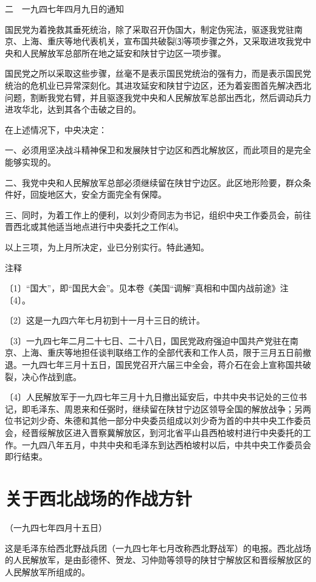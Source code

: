 \documentclass[UTF-8, a5paper, 12pt]{ctexart}
\begin{document}
二　一九四七年四月九日的通知

国民党为着挽救其垂死统治，除了采取召开伪国大，制定伪宪法，驱逐我党驻南京、上海、重庆等地代表机关，宣布国共破裂⑶等项步骤之外，又采取进攻我党中央和人民解放军总部所在地之延安和陕甘宁边区一项步骤。

国民党之所以采取这些步骤，丝毫不是表示国民党统治的强有力，而是表示国民党统治的危机业已异常深刻化。其进攻延安和陕甘宁边区，还为着妄图首先解决西北问题，割断我党右臂，并且驱逐我党中央和人民解放军总部出西北，然后调动兵力进攻华北，达到其各个击破之目的。

在上述情况下，中央决定：

一、必须用坚决战斗精神保卫和发展陕甘宁边区和西北解放区，而此项目的是完全能够实现的。

二、我党中央和人民解放军总部必须继续留在陕甘宁边区。此区地形险要，群众条件好，回旋地区大，安全方面完全有保障。

三、同时，为着工作上的便利，以刘少奇同志为书记，组织中央工作委员会，前往晋西北或其他适当地点进行中央委托之工作⑷。

以上三项，为上月所决定，业已分别实行。特此通知。

注释

〔1〕“国大”，即“国民大会”。见本卷《美国“调解”真相和中国内战前途》注〔4〕。

〔2〕这是一九四六年七月初到十一月十三日的统计。

〔3〕一九四七年二月二十七日、二十八日，国民党政府强迫中国共产党驻在南京、上海、重庆等地担任谈判联络工作的全部代表和工作人员，限于三月五日前撤退。一九四七年三月十五日，国民党召开六届三中全会，蒋介石在会上宣称国共破裂，决心作战到底。

〔4〕人民解放军于一九四七年三月十九日撤出延安后，中共中央书记处的三位书记，即毛泽东、周恩来和任弼时，继续留在陕甘宁边区领导全国的解放战争；另两位书记刘少奇、朱德和其他一部分中央委员组成以刘少奇为首的中共中央工作委员会，经晋绥解放区进入晋察冀解放区，到河北省平山县西柏坡村进行中央委托的工作。一九四八年五月，中共中央和毛泽东到达西柏坡村以后，中共中央工作委员会即行结束。 










\section{关于西北战场的作战方针}


（一九四七年四月十五日）

这是毛泽东给西北野战兵团（一九四七年七月改称西北野战军）的电报。西北战场的人民解放军，是由彭德怀、贺龙、习仲勋等领导的陕甘宁解放区和晋绥解放区的人民解放军所组成的。
\end{document}
